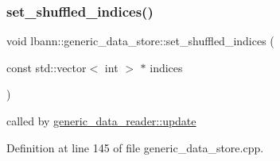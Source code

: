 \subsubsection{\texorpdfstring{set\+\_\+shuffled\+\_\+indices()}{set\_shuffled\_indices()}}
{\footnotesize\ttfamily void lbann\+::generic\+\_\+data\+\_\+store\+::set\+\_\+shuffled\+\_\+indices (\begin{DoxyParamCaption}\item[{const std\+::vector$<$ int $>$ $\ast$}]{indices }\end{DoxyParamCaption})}



called by \hyperlink{classlbann_1_1generic__data__reader_a1d10dec5713fbe60e61b4dc400227ade}{generic\+\_\+data\+\_\+reader\+::update} 



Definition at line 145 of file generic\+\_\+data\+\_\+store.\+cpp.


